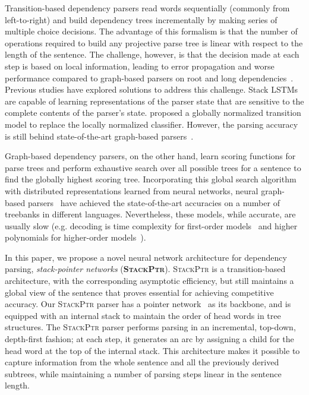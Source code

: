 \documentclass[11pt,a4paper]{article}
\begin{document}
Transition-based dependency parsers read words sequentially (commonly from left-to-right) and build dependency trees incrementally by making series of multiple choice  decisions. The advantage of this formalism is that the number of operations required to build any projective parse tree is linear with respect to the length of the sentence. 
The challenge, however, is that the decision made at each step is based on local information, leading to error propagation and worse performance compared to graph-based parsers on root and long dependencies~\citep{mcdonald2011analyzing}.
Previous studies have explored solutions to address this challenge.
Stack LSTMs~\citep{dyer-EtAl:2015:ACL-IJCNLP,ballesteros-dyer-smith:2015:EMNLP,ballesteros-EtAl:2016:EMNLP2016} are capable of learning representations of the parser state that are sensitive to the complete contents of the parser's state. 
\citet{andor-EtAl:2016:P16-1} proposed a globally normalized transition model to replace the locally normalized classifier.
However, the parsing accuracy is still behind state-of-the-art graph-based parsers~\citep{dozat2017:ICLR}. 

Graph-based dependency parsers, on the other hand, learn scoring functions for parse trees and perform exhaustive search over all possible trees for a sentence to find the globally highest scoring tree. 
Incorporating this global search algorithm with distributed representations learned from neural networks, neural graph-based parsers~\citep{TACL885,wang-chang:2016:P16-1,kuncoro-EtAl:2016:EMNLP2016,dozat2017:ICLR} have achieved the state-of-the-art accuracies on a number of treebanks in different languages.
Nevertheless, these models, while accurate, are usually slow (e.g. decoding is  time complexity for first-order models~\cite{McDonald:2005,McDonald:2005b} and higher polynomials for higher-order models~\citep{mcdonald2006online,Koo:2010,ma2012probabilistic,ma-zhao:2012:POSTERS}).

In this paper, we propose a novel neural network architecture for dependency parsing, \emph{stack-pointer networks} (\textbf{\textsc{StackPtr}}).
\textsc{StackPtr} is a transition-based architecture, with the corresponding asymptotic efficiency, but still maintains a global view of the sentence that proves essential for achieving competitive accuracy.
Our \textsc{StackPtr} parser has a pointer network~\citep{vinyals2015pointer} as its backbone, and is equipped with an internal stack to maintain the order of head words in tree structures. 
The \textsc{StackPtr} parser performs parsing in an incremental, top-down, depth-first fashion; at each step, it generates an arc by assigning a child for the head word at the top of the internal stack. 
This architecture makes it possible to capture information from the whole sentence and all the previously derived subtrees, while maintaining a number of parsing steps linear in the sentence length.
\end{document}

